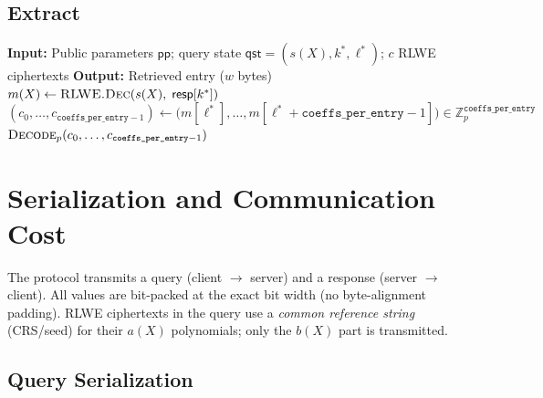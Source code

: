 \documentclass[11pt,a4paper]{article}
\newcommand{\Z}{\mathbb{Z}}
\begin{document}
\subsection{Extract}\label{sec:extract}

\begin{algorithm}[H]
\caption{$\textsc{Extract}(\mathsf{pp},\; \mathsf{qst},\; \mathsf{resp})$}
\label{alg:extract}
\begin{algorithmic}[1]
\State \textbf{Input:} Public parameters $\mathsf{pp}$; query state $\mathsf{qst} = (s(X), k^*, \ell^*)$; $c$ RLWE ciphertexts
\State \textbf{Output:} Retrieved entry ($w$ bytes)
\Statex
\State $m(X) \gets \textsc{RLWE.Dec}(s(X),\; \mathsf{resp}[k^*])$ 
\State $(c_0, \ldots, c_{\texttt{coeffs\_per\_entry}-1}) \gets \bigl(m[\ell^*], \ldots, m[\ell^* + \texttt{coeffs\_per\_entry} - 1]\bigr) \in \Z_p^{\texttt{coeffs\_per\_entry}}$ 
\State \Return $\textsc{Decode}_p(c_0, \ldots, c_{\texttt{coeffs\_per\_entry}-1})$ 
\end{algorithmic}
\end{algorithm}


\section{Serialization and Communication Cost}\label{sec:serialization}

The protocol transmits a query (client $\to$ server) and a response (server $\to$ client).
All values are bit-packed at the exact bit width (no byte-alignment padding).
RLWE ciphertexts in the query use a \emph{common reference string} (CRS/seed) for their $a(X)$ polynomials; only the $b(X)$ part is transmitted.

\subsection{Query Serialization}\label{sec:serialize-query}
\end{document}
